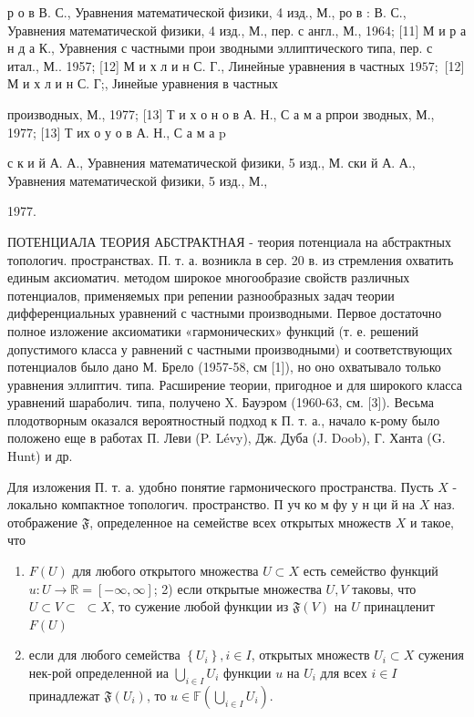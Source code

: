 \documentclass[10pt]{article}
\begin{document}
р о в В. С., Уравнения математической физики, 4 изд., М., ро в : В. С., Уравнения математической физики, 4 изд., М., пер. с англ., М., 1964; [11] М и р а н д а К., Уравнения с частными прои зводными эллиптического типа, пер. с итал., М.. 1957; [12] М и х л и н С. Г., Линейные уравнения в частных $1957 ;$ [12] М и х л и н С. Г;, Јинейые уравнения в частных

производных, М., 1977; [13] Т и х о н о в А. Н., С а м а рпрои зводных, М., 1977; [13] Т их о у о в А. Н., С а м а p

с к и й А. А., Уравнения математической физики, 5 изд., М. ски й А. А., Уравнения математической физики, 5 изд., М.,

1977.



ПОТЕНЦИАЛА ТЕОРИЯ АБСТРАКТНАЯ - теория потенциала на абстрактных топологич. пространствах. П. т. а. возникла в сер. 20 в. из стремления охватить единым аксиоматич. методом широкое многообразие свойств различных потенциалов, применяемых при репении разнообразных задач теории дифференциальных уравнений с частными производными. Первое достаточно полное изложение аксиоматики «гармонических» функций (т. е. решений допустимого класса у равнений с частными производными) и соответствующих потенциалов было дано М. Брело (1957-58, см [1]), но оно охватывало только уравнения эллиптич. типа. Расширение теории, пригодное и для широкого класса уравнений шараболич. типа, получено X. Бауэром (1960-63, см. [3]). Весьма плодотворным оказался вероятностный подход к П. т. а., начало к-рому было положено еще в работах П. Леви (P. Lévy), Дж. Дуба (J. Doob), Г. Ханта (G. Hunt) и др.



Для изложения П. т. а. удобно понятие гармонического пространства. Пусть $X$ - локально компактное топологич. пространство. П уч ко м фу у н ци й на $X$ наз. отображение $\mathfrak{F}$, определенное на семействе всех открытых множеств $X$ и такое, что



\begin{enumerate}

  \item $F(U)$ для любого открытого множества $U \subset X$ есть семейство функций $u: U \rightarrow \mathbb{R}=[-\infty, \infty]$; 2) если открытые множества $U, V$ таковы, что $U \subset V \subset$ $\subset X$, то сужение любой функции из $\mathfrak{F}(V)$ на $U$ принацленит $F(U)$



  \item если для любого семейства $\left\{U_{i}\right\}, i \in I$, открытых множеств $U_{i} \subset X$ сужения нек-рой определенной иа $\bigcup_{i \in I} U_{i}$ функции $u$ на $U_{i}$ для всех $i \in I$ принадлежат $\mathfrak{F}\left(U_{i}\right)$, то $u \in \mathbb{F}\left(\bigcup_{i \in I} U_{i}\right)$.



\end{enumerate}
\end{document}
